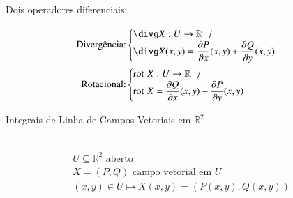 \begin{center}
\end{center}

	\begin{large}
	Dois operadores diferenciais:
	\end{large}
	\begin{center}
	\begin{align*}
	\text{Divergência:}&
	\begin{cases}
	\divg X:U\to\mathbb{R}\hspace{6pt} / \\
	\divg X(x,y) = \dfrac{\partial P}{\partial x}(x,y) + \dfrac{\partial Q}{\partial y}(x,y)
	\end{cases} \\
	\text{Rotacional:}&
	\begin{cases}
	\rotg X:U\to\mathbb{R}\hspace{6pt} / \\
	\rotg X = \dfrac{\partial Q}{\partial x}(x,y) - \dfrac{\partial P}{\partial y}(x,y)
	\end{cases}
	\end{align*}
	\end{center}
	
\begin{large}
Integrais de Linha de Campos Vetoriais em $\mathbb{R}^2$
\end{large}\\
\begin{gather*}
U\subseteq\mathbb{R}^2 \text{	aberto} \\
X = (P,Q) \text{	campo vetorial em $U$} \\
(x,y)\in U \mapsto X(x,y) = (P(x,y),Q(x,y))
\end{gather*}	


